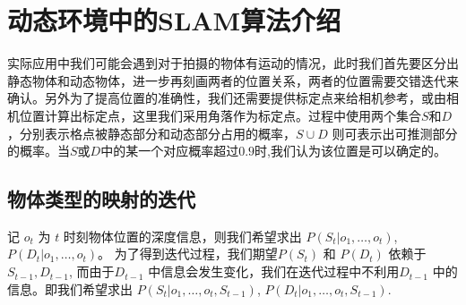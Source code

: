 \chapter{动态环境中的SLAM算法介绍}
实际应用中我们可能会遇到对于拍摄的物体有运动的情况，此时我们首先要区分出静态物体和动态物体，进一步再刻画两者的位置关系，两者的位置需要交错迭代来确认。另外为了提高位置的准确性，我们还需要提供标定点来给相机参考\cite{wang2002simultaneous}，或由相机位置计算出标定点\cite{wang2003online}，这里我们采用角落作为标定点。过程中使用两个集合$S$和$D$，分别表示格点被静态部分和动态部分占用的概率，$S \cup D$ 则可表示出可推测部分的概率。当$S$或$D$中的某一个对应概率超过$0.9$时,我们认为该位置是可以确定的。
\section{物体类型的映射的迭代}
记 $o_t$ 为 $t$ 时刻物体位置的深度信息，则我们希望求出 $P(S_t|o_1,…,o_t)$, $P(D_t|o_1,…,o_t)$。 为了得到迭代过程，我们期望$P(S_t)$ 和 $P(D_t)$ 依赖于 $S_{t-1}, D_{t-1}$, 而由于$D_{t-1}$ 中信息会发生变化，我们在迭代过程中不利用$D_{t-1}$ 中的信息。即我们希望求出 $P(S_t|o_1,…,o_t,S_{t-1})$, $P(D_t|o_1,…,o_t,S_{t-1})$.
